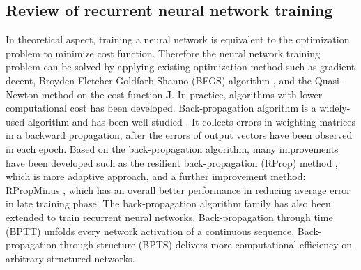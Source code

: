 \subsection{Review of recurrent neural network training}
In theoretical aspect, training a neural network
is equivalent to the optimization problem to minimize cost function.
Therefore the neural network training problem can be solved by
applying existing optimization method such as gradient decent,
Broyden-Fletcher-Goldfarb-Shanno (BFGS) algorithm
\cite{michael1997scientific}, and the Quasi-Newton method on the cost
function $\boldsymbol{J}$. In practice, algorithms with lower
computational cost has been developed. Back-propagation algorithm is a
widely-used algorithm and has been well studied
\cite{hecht1989theory}. It
collects errors in weighting matrices
in a backward propagation, after the errors of output vectors have
been observed in each epoch. Based on the back-propagation algorithm,
many improvements have been developed such as the resilient
back-propagation (RProp) method \cite{riedmiller1993direct}, which is
more adaptive approach, and a further improvement method: RPropMinus
\cite{igel2003empirical}, which has an overall better performance in
reducing average error in late training phase. The back-propagation
algorithm family has also been extended to train recurrent neural
networks. Back-propagation through time (BPTT)
\cite{werbos1990backpropagation} unfolds every network activation of a
continuous sequence. Back-propagation through structure (BPTS)
\cite{goller1996learning} delivers more computational efficiency on
arbitrary structured networks.
